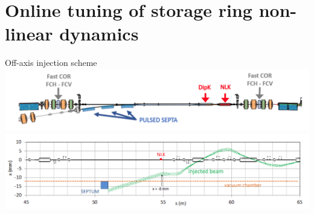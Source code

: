 \documentclass[aspectratio=169]{beamer}
\begin{document}
\section{Online tuning of storage ring non-linear dynamics}
\begin{frame}{Off-axis injection scheme}
    \centering
    \includegraphics[width=\textwidth]{off_axis_injection.png}
    \includegraphics[width=\textwidth]{off_axis_scheme.png}

\end{frame}
\end{document}
